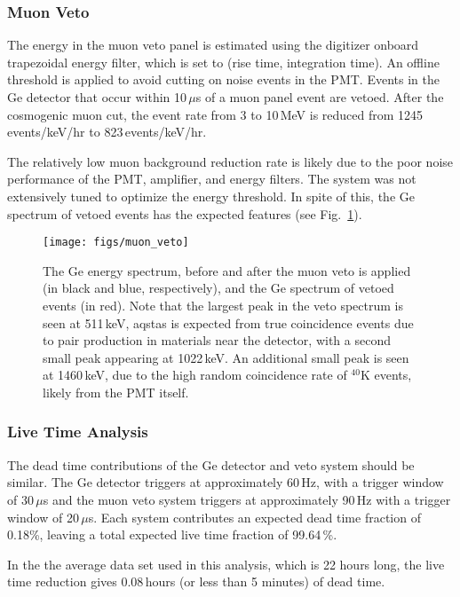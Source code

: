 \documentclass[groupedaddress,rmp,amsmath,amssymb,bibnotes,altaffilletter,twocolumn]{revtex4-1}
\begin{document}
\subsubsection{Muon Veto}
The energy in the muon veto panel is estimated using the digitizer onboard trapezoidal energy filter, which is set to (rise time, integration time). An offline threshold is applied to avoid cutting on noise events in the PMT. Events in the Ge detector that occur within 10\,$\mu$s of a muon panel event are vetoed. After the cosmogenic muon cut, the event rate from 3 to 10\,MeV is reduced from 1245\,events/keV/hr to 823\,events/keV/hr. 

The relatively low muon background reduction rate is likely due to the poor noise performance of the PMT, amplifier, and energy filters. The system was not extensively tuned to optimize the energy threshold. In spite of this, the Ge spectrum of vetoed events has the expected features (see Fig.~\ref{fig:muVeto}).

\begin{figure}[h]
 \centering
 \texttt{[image: figs/muon\_veto]}
 \caption{The Ge energy spectrum, before and after the muon veto is applied (in black and blue, respectively), and the Ge spectrum of vetoed events (in red). Note that the largest peak in the veto spectrum is seen at 511\,keV, aqstas is expected from true coincidence events due to pair production in materials near the detector, with a second small peak appearing at 1022\,keV. An additional small peak is seen at 1460\,keV, due to the high random coincidence rate of $^{40}$K events, likely from the PMT itself.} 
 \label{fig:muVeto}
\end{figure}

\subsubsection{Live Time Analysis}
The dead time contributions of the Ge detector and veto system should be similar. The Ge detector triggers at approximately 60\,Hz, with a trigger window of 30\,$\mu$s and the muon veto system triggers at approximately 90\,Hz with a trigger window of 20\,$\mu$s. Each system contributes an expected dead time fraction of 0.18\%, leaving a total expected live time fraction of 99.64\,\%. 

In the the average data set used in this analysis, which is 22 hours long, the live time reduction gives 0.08\,hours (or less than 5 minutes) of dead time. 
\end{document}
